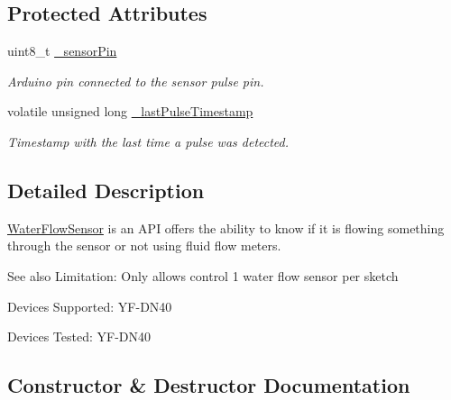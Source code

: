 \subsection*{Protected Attributes}
\begin{DoxyCompactItemize}
\item 
\mbox{\label{class_easyuino_1_1_water_flow_sensor_a7efef15ef9da3a66bd40183c4ea908ff}} 
uint8\+\_\+t \hyperlink{class_easyuino_1_1_water_flow_sensor_a7efef15ef9da3a66bd40183c4ea908ff}{\+\_\+sensor\+Pin}
\begin{DoxyCompactList}\small\item\em Arduino pin connected to the sensor pulse pin. \end{DoxyCompactList}\item 
\mbox{\label{class_easyuino_1_1_water_flow_sensor_a28f717a1424eaa47eb6cf08d5de76fb0}} 
volatile unsigned long \hyperlink{class_easyuino_1_1_water_flow_sensor_a28f717a1424eaa47eb6cf08d5de76fb0}{\+\_\+last\+Pulse\+Timestamp}
\begin{DoxyCompactList}\small\item\em Timestamp with the last time a pulse was detected. \end{DoxyCompactList}\end{DoxyCompactItemize}


\subsection{Detailed Description}
\hyperlink{class_easyuino_1_1_water_flow_sensor}{Water\+Flow\+Sensor} is an A\+PI offers the ability to know if it is flowing something through the sensor or not using fluid flow meters. 

\begin{DoxySeeAlso}{See also}
Limitation\+: Only allows control 1 water flow sensor per sketch 

Devices Supported\+: Y\+F-\/\+D\+N40 

Devices Tested\+: Y\+F-\/\+D\+N40 
\end{DoxySeeAlso}


\subsection{Constructor \& Destructor Documentation}
\mbox{\label{class_easyuino_1_1_water_flow_sensor_acee82d1863cb2311e58210906d9fbfaa}} 

